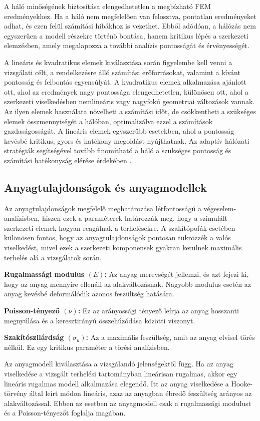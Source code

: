 \documentclass[12pt,a4paper,oneside]{report}
\begin{document}
A háló minőségének biztosítása elengedhetetlen a megbízható FEM eredményekhez. Ha a háló nem megfelelően van felosztva, pontatlan eredményeket adhat, és ezen felül számítási hibákhoz is vezethet. Ebből adódóan, a hálózás nem egyszerűen a modell részekre történő bontása, hanem kritikus lépés a szerkezeti elemzésben, amely megalapozza a további analízis pontosságát és érvényességét.

A lineáris és kvadratikus elemek kiválasztása során figyelembe kell venni a vizsgálati célt, a rendelkezésre álló számítási erőforrásokat, valamint a kívánt pontosság és felbontás egyensúlyát. A kvadratikus elemek alkalmazása ajánlott ott, ahol az eredmények nagy pontossága elengedhetetlen, különösen ott, ahol a szerkezeti viselkedésben nemlineáris vagy nagyfokú geometriai változások vannak. Az ilyen elemek használata növelheti a számítási időt, de csökkentheti a szükséges elemek összmennyiségét a hálóban, optimalizálva ezzel a számítások gazdaságosságát. A lineáris elemek egyszerűbb esetekben, ahol a pontosság kevésbé kritikus, gyors és hatékony megoldást nyújthatnak. Az adaptív hálózati stratégiák segítségével tovább finomítható a háló a szükséges pontosság és számítási hatékonyság elérése érdekében \cite{tamas2014vegeselem}.

\subsection{Anyagtulajdonságok és anyagmodellek}
Az anyagtulajdonságok megfelelő meghatározása létfontosságú a végeselem-analízisben, hiszen ezek a paraméterek határozzák meg, hogy a szimulált szerkezeti elemek hogyan reagálnak a terhelésekre. A szakítópofák esetében különösen fontos, hogy az anyagtulajdonságok pontosan tükrözzék a valós viselkedést, mivel ezek a szerkezeti komponensek gyakran kerülnek maximális terhelés alá a vizsgálatok során.

\textbf{Rugalmassági modulus $(E)$:} Az anyag merevségét jellemzi, és azt fejezi ki, hogy az anyag mennyire ellenáll az alakváltozásnak. Nagyobb modulus esetén az anyag kevésbé deformálódik azonos feszültség hatására.

\textbf{Poisson-tényező $(\nu)$:} Ez az arányossági tényező leírja az anyag hosszanti megnyúlása és a keresztirányú összehúzódása közötti viszonyt.

\textbf{Szakítószilárdság $(\sigma_u)$:} Az a maximális feszültség, amit az anyag elvisel törés nélkül. Ez egy kritikus paraméter a törési analízisben.

Az anyagmodell kiválasztása a vizsgálandó jelenségektől függ. Ha az anyag viselkedése a vizsgált terhelési tartományban lineárisan rugalmas, akkor egy lineáris rugalmas modell alkalmazása elegendő. Itt az anyag viselkedése a Hooke-törvény által leírt módon lineáris, azaz az anyagban ébredő feszültség arányos az alakváltozással. Ebben az esetben az anyagmodell csak a rugalmassági modulust és a Poisson-tényezőt foglalja magában.
\end{document}
